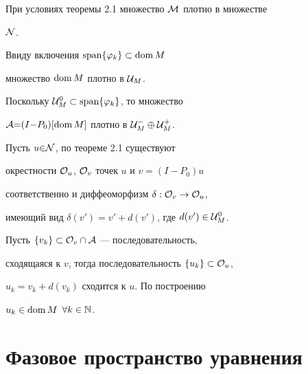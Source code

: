 \begin{cors}


При условиях теоремы 2.1 множество $\cal M$ плотно в множестве


$\cal N$.


\end{cors}





\begin{pf}


Ввиду включения $\operatorname{span}\{\varphi_k\}\subset\operatorname{dom} M$


множество $\operatorname{dom} M$ плотно в ${\cal U}_M$.


Поскольку ${\cal U}^0_M\subset\operatorname{span}\{\varphi_k\}$, то множество


${\cal A} {=} (I{-}P_0)[\operatorname{dom} M]$ плотно в ${\cal U}^-_M\oplus{\cal U}^+_M$.


Пусть $u{\in} {\cal N}$, по теореме 2.1 существуют


окрестности ${\cal O}_u$, ${\cal O}_v$ точек $u$ и $v = (I - P_0)u$


соответственно и диффеоморфизм $\delta :{\cal O}_v\to{\cal O}_u $,


имеющий вид $\delta(v') = v' + d(v')$, где $d(v')\in{\cal U}^0_M$.


Пусть $\{v_k\}\subset{\cal O}_v\cap{\cal A}$ --- последовательность,


сходящаяся к $v$, тогда последовательность $\{u_k\}\subset{\cal O}_u$,


$u_k = v_k + d(v_k)$ сходится к $u$. По построению


$u_k\in\operatorname{dom} M$\; $\forall k\in{\Bbb N}$.


\end{pf}








\section{Фазовое пространство уравнения}





